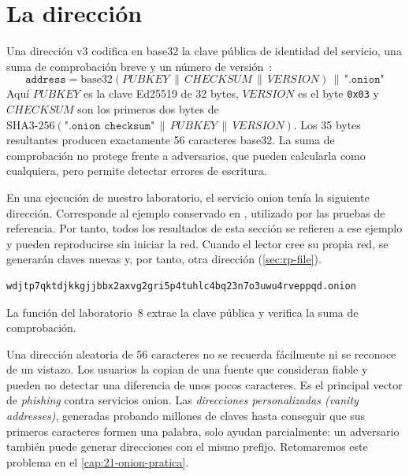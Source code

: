 \section{La dirección}\label{sec:os-indirizzo}

Una dirección v3 codifica en base32 la clave pública de identidad del servicio, una suma de comprobación breve y un número de versión~:
\[
\texttt{address} = \mathrm{base32}(\mathit{PUBKEY} \,\|\, \mathit{CHECKSUM} \,\|\, \mathit{VERSION}) \,\|\, \texttt{".onion"}
\]
Aquí $\mathit{PUBKEY}$ es la clave Ed25519 de 32 bytes, $\mathit{VERSION}$ es el byte \texttt{0x03} y $\mathit{CHECKSUM}$ son los primeros dos bytes de $\mathrm{SHA3\text{-}256}(\texttt{".onion checksum"} \,\|\, \mathit{PUBKEY} \,\|\, \mathit{VERSION})$. Los 35 bytes resultantes producen exactamente 56 caracteres base32. La suma de comprobación no protege frente a adversarios, que pueden calcularla como cualquiera, pero permite detectar errores de escritura.

En una ejecución de nuestro laboratorio, el servicio onion tenía la siguiente dirección. Corresponde al ejemplo conservado en , utilizado por las pruebas de referencia. Por tanto, todos los resultados de esta sección se refieren a ese ejemplo y pueden reproducirse sin iniciar la red. Cuando el lector cree su propia red, se generarán claves nuevas y, por tanto, otra dirección (\cref{sec:rp-file}).
\begin{lstlisting}[numbers=none]
wdjtp7qktdjkkgjjbbx2axvg2gri5p4tuhlc4bq23n7o3uwu4rveppqd.onion
\end{lstlisting}
La función  del laboratorio~8 extrae la clave pública y verifica la suma de comprobación.

\begin{attenzione}
Una dirección aleatoria de 56 caracteres no se recuerda fácilmente ni se reconoce de un vistazo. Los usuarios la copian de una fuente que consideran fiable y pueden no detectar una diferencia de unos pocos caracteres. Es el principal vector de \emph{phishing} contra servicios onion. Las \emph{direcciones personalizadas (vanity addresses)}, generadas probando millones de claves hasta conseguir que sus primeros caracteres formen una palabra, solo ayudan parcialmente: un adversario también puede generar direcciones con el mismo prefijo. Retomaremos este problema en el \cref{cap:21-onion-pratica}.
\end{attenzione}

